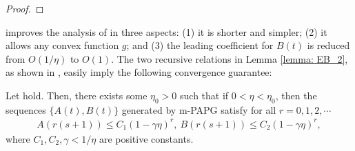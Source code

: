 \documentclass[leqno,onefignum,onetabnum]{siamart0516}
\newcommand{\xb}{\mathbf{x}}
\newcommand{\zb}{\mathbf{z}}
\newcommand{\mspg}{\textsf{m-PAPG}\xspace}
\begin{document}
\begin{proof}
\end{proof}

 improves the analysis of \cite{Tseng_linear_PAA} in three aspects: (1) it is shorter and simpler; (2) it allows any convex function $g$; and (3) the leading coefficient for $B(t)$ is reduced from $O(1/\eta)$ to $O(1)$. 
The two recursive relations in Lemma \ref{lemma: EB_2}, as shown in \cite[Lemma 4.5]{Tseng_linear_PAA}, easily imply the following convergence guarantee:
\begin{theorem}\label{coro: s step linear}
	Let  hold. Then, there exists some $\eta_0 >0$ such that if $0<\eta<\eta_0$, then the sequences $\{A(t), B(t)\}$ generated by \mspg satisfy for all $r = 0, 1, 2, \cdots$
	\begin{align}
	A(r (s+1)) \le C_1 (1-\gamma \eta)^{r},  ~B(r (s+1)) \le C_2 (1-\gamma \eta)^{r},
	\end{align}
	where $C_1, C_2,\gamma<1/\eta$ are positive constants.
\end{theorem}
\end{document}
